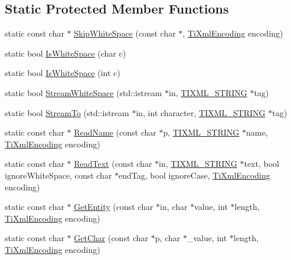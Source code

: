 \subsection*{Static Protected Member Functions}
\begin{DoxyCompactItemize}
\item 
static const char $\ast$ \hyperlink{class_ti_xml_base_ac0c3d66d8a9e6996a1fa016275e16875}{Skip\-White\-Space} (const char $\ast$, \hyperlink{tinyxml_8h_a88d51847a13ee0f4b4d320d03d2c4d96}{Ti\-Xml\-Encoding} encoding)
\item 
static bool \hyperlink{class_ti_xml_base_af56296d561c0bab4bc8e198cdcf5c48e}{Is\-White\-Space} (char c)
\item 
static bool \hyperlink{class_ti_xml_base_a3de391ea9f4c4a8aa10d04480b048795}{Is\-White\-Space} (int c)
\item 
static bool \hyperlink{class_ti_xml_base_a189eaa418ff6628bdabf4bf8fb1bd633}{Stream\-White\-Space} (std\-::istream $\ast$in, \hyperlink{tinyxml_8h_a92bada05fd84d9a0c9a5bbe53de26887}{T\-I\-X\-M\-L\-\_\-\-S\-T\-R\-I\-N\-G} $\ast$tag)
\item 
static bool \hyperlink{class_ti_xml_base_aae465f424a9bcf7a9cf2426c62da8e6b}{Stream\-To} (std\-::istream $\ast$in, int character, \hyperlink{tinyxml_8h_a92bada05fd84d9a0c9a5bbe53de26887}{T\-I\-X\-M\-L\-\_\-\-S\-T\-R\-I\-N\-G} $\ast$tag)
\item 
static const char $\ast$ \hyperlink{class_ti_xml_base_a1c21a6ab5f7b503acd91f35f183734b3}{Read\-Name} (const char $\ast$p, \hyperlink{tinyxml_8h_a92bada05fd84d9a0c9a5bbe53de26887}{T\-I\-X\-M\-L\-\_\-\-S\-T\-R\-I\-N\-G} $\ast$name, \hyperlink{tinyxml_8h_a88d51847a13ee0f4b4d320d03d2c4d96}{Ti\-Xml\-Encoding} encoding)
\item 
static const char $\ast$ \hyperlink{class_ti_xml_base_aa646c74921aa33156968b802bbf5566e}{Read\-Text} (const char $\ast$in, \hyperlink{tinyxml_8h_a92bada05fd84d9a0c9a5bbe53de26887}{T\-I\-X\-M\-L\-\_\-\-S\-T\-R\-I\-N\-G} $\ast$text, bool ignore\-White\-Space, const char $\ast$end\-Tag, bool ignore\-Case, \hyperlink{tinyxml_8h_a88d51847a13ee0f4b4d320d03d2c4d96}{Ti\-Xml\-Encoding} encoding)
\item 
static const char $\ast$ \hyperlink{class_ti_xml_base_ac5c08bf3deffcda0bf8ce2958372b584}{Get\-Entity} (const char $\ast$in, char $\ast$value, int $\ast$length, \hyperlink{tinyxml_8h_a88d51847a13ee0f4b4d320d03d2c4d96}{Ti\-Xml\-Encoding} encoding)
\item 
static const char $\ast$ \hyperlink{class_ti_xml_base_a5b0fde72d6f662ae1fd6303195d2159b}{Get\-Char} (const char $\ast$p, char $\ast$\-\_\-value, int $\ast$length, \hyperlink{tinyxml_8h_a88d51847a13ee0f4b4d320d03d2c4d96}{Ti\-Xml\-Encoding} encoding)

\end{DoxyCompactItemize}
